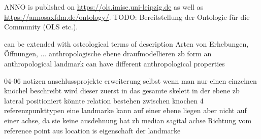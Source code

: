 \documentclass[sw]{iosart2x}
\begin{document}
ANNO is published on \url{https://ols.imise.uni-leipzig.de} as well as \url{https://annosaxfdm.de/ontology/}.
TODO: Bereitstellung der Ontologie für die Community (OLS etc.).

can be extended with osteological terms of description
Arten von Erhebungen, Öffnungen, ...
anthropologische ebene draufmodellieren zb form
an anthropological landmark can have different anthropological properties

04-06 notizen
anschlussprojekte erweiterung
selbst wenn man nur einen einzelnen knöchel beschreibt wird dieser zuerst in das gesamte skelett
in der ebene zb lateral positioniert
könnte relation bestehen zwischen knochen
4 referenzpunkttypen
eine landmarke kann auf einer ebene liegen aber nicht auf einer achse, da sie keine ausdehnung hat
zb median sagital achse
Richtung vom reference point aus
location is eigenschaft der landmarke


\end{document}
